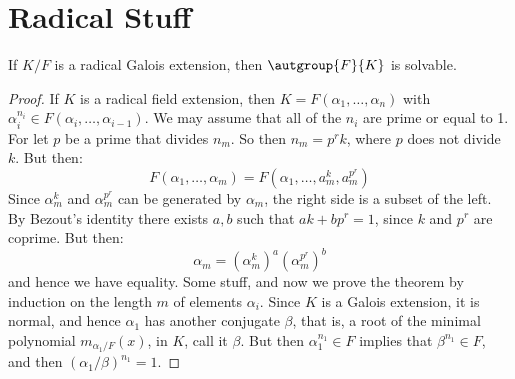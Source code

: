 \documentclass{article}                                                        %
\begin{document}
    \section{Radical Stuff}
        \begin{theorem}
            If $K/F$ is a radical Galois extension, then $\autgroup{F}{K}$
            is solvable.
        \end{theorem}
        \begin{proof}
            If $K$ is a radical field extension, then
            $K=F(\alpha_{1},\dots,\alpha_{n})$ with
            $\alpha_{i}^{n_{i}}\in{F}(\alpha_{i},\dots,\alpha_{i-1})$. We may
            assume that all of the $n_{i}$ are prime or equal to 1. For let
            $p$ be a prime that divides $n_{m}$. So then
            $n_{m}=p^{r}k$, where $p$ does not divide $k$. But then:
            \begin{equation}
                F(\alpha_{1},\dots,\alpha_{m})
                    =F(\alpha_{1},\dots,a_{m}^{k},a_{m}^{p^{r}})
            \end{equation}
            Since $\alpha_{m}^{k}$ and $\alpha_{m}^{p^{r}}$ can be generated
            by $\alpha_{m}$, the right side is a subset of the left. By Bezout's
            identity there exists $a,b$ such that $ak+bp^{r}=1$, since
            $k$ and $p^{r}$ are coprime. But then:
            \begin{equation}
                \alpha_{m}=(\alpha_{m}^{k})^{a}(\alpha_{m}^{p^{r}})^{b}
            \end{equation}
            and hence we have equality. Some stuff, and now we prove the theorem
            by induction on the length $m$ of elements $\alpha_{i}$. Since $K$
            is a Galois extension, it is normal, and hence $\alpha_{1}$ has
            another conjugate $\beta$, that is, a root of the minimal polynomial
            $m_{\alpha_{1}/F}(x)$, in $K$, call it $\beta$. But then
            $\alpha_{1}^{n_{1}}\in{F}$ implies that $\beta^{n_{1}}\in{F}$, and
            then $(\alpha_{1}/\beta)^{n_{1}}=1$.
        \end{proof}
\end{document}
